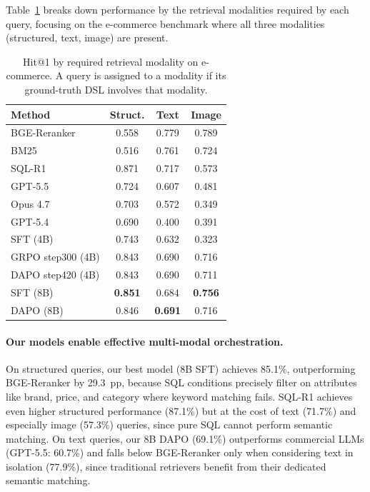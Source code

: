 Table~\ref{tab:modality} breaks down performance by the retrieval modalities required by each query, focusing on the e-commerce benchmark where all three modalities (structured, text, image) are present.

\begin{table}[t]
\centering
\small
\caption{Hit@1 by required retrieval modality on e-commerce. A query is assigned to a modality if its ground-truth DSL involves that modality.}
\label{tab:modality}
\begin{tabular}{lccc}
\toprule
\textbf{Method} & \textbf{Struct.} & \textbf{Text} & \textbf{Image} \\
\midrule
BGE-Reranker & 0.558 & 0.779 & 0.789 \\
BM25 & 0.516 & 0.761 & 0.724 \\
\midrule
SQL-R1 & 0.871 & 0.717 & 0.573 \\
\midrule
GPT-5.5 & 0.724 & 0.607 & 0.481 \\
Opus 4.7 & 0.703 & 0.572 & 0.349 \\
GPT-5.4 & 0.690 & 0.400 & 0.391 \\
\midrule
SFT (4B) & 0.743 & 0.632 & 0.323 \\
GRPO step300 (4B) & 0.843 & 0.690 & 0.716 \\
DAPO step420 (4B) & 0.843 & 0.690 & 0.711 \\
SFT (8B) & \textbf{0.851} & 0.684 & \textbf{0.756} \\
DAPO (8B) & 0.846 & \textbf{0.691} & 0.716 \\
\bottomrule
\end{tabular}
\end{table}

\paragraph{Our models enable effective multi-modal orchestration.}
On structured queries, our best model (8B SFT) achieves 85.1\%, outperforming BGE-Reranker by 29.3~pp, because SQL conditions precisely filter on attributes like brand, price, and category where keyword matching fails. SQL-R1 achieves even higher structured performance (87.1\%) but at the cost of text (71.7\%) and especially image (57.3\%) queries, since pure SQL cannot perform semantic matching.
On text queries, our 8B DAPO (69.1\%) outperforms commercial LLMs (GPT-5.5: 60.7\%) and falls below BGE-Reranker only when considering text in isolation (77.9\%), since traditional retrievers benefit from their dedicated semantic matching.

